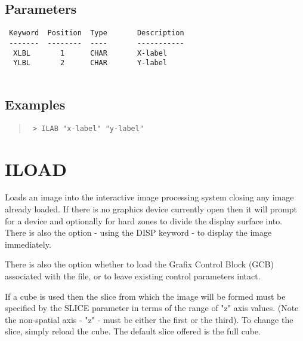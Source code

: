 \documentclass{book}
\renewcommand{\_}{{\tt\char'137}}     %
\begin{document}
\subsection{Parameters}
\begin{verbatim}
 Keyword  Position  Type       Description
 -------  --------  ----       -----------
  XLBL       1      CHAR       X-label
  YLBL       2      CHAR       Y-label
 
\end{verbatim}\subsection{Examples}
\begin{quote}\begin{verbatim}
 > ILAB "x-label" "y-label"
 \end{verbatim}\end{quote}
\section{ILOAD}
Loads an image into the interactive image processing system closing
any image already loaded. If there is no graphics device currently
open then it will prompt for a device and optionally for hard zones
to divide the display surface into. There is also the option - using
the DISP keyword - to display the image immediately.
 
There is also the option whether to load the Grafix Control Block
(GCB) associated with the file, or to leave existing control
parameters intact.
 
If a cube is used then the slice from which the image will be
formed must be specified by the SLICE parameter in terms of
the range of "z" axis values. (Note the non-spatial axis
- "z" - must be either the first or the third). To change
the slice, simply reload the cube. The default slice
offered is the full cube.
 
\end{document}

